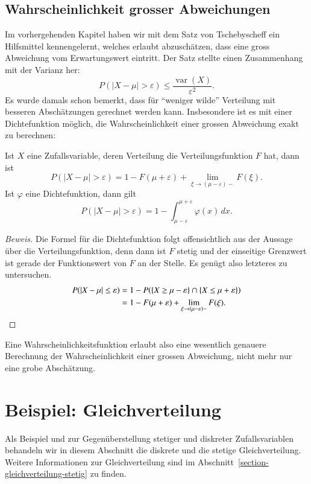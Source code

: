 \subsection{Wahrscheinlichkeit grosser Abweichungen}
Im vorhergehenden Kapitel haben wir mit dem Satz von Tschebyscheff ein
Hilfsmittel kennengelernt, welches erlaubt abzuschätzen, dass eine
gross Abweichung vom Erwartungswert eintritt.
Der Satz stellte einen
Zusammenhang mit der Varianz her:
\[
P(|X-\mu|>\varepsilon)\le\frac{\operatorname{var}(X)}{\varepsilon^2}.
\]
Es wurde damals schon bemerkt, dass für ``weniger wilde'' Verteilung mit
besseren Abschätzungen gerechnet werden kann.
Insbesondere ist es mit
einer Dichtefunktion möglich, die Wahrscheinlichkeit einer grossen
Abweichung exakt zu berechnen:
\begin{satz} Ist $X$ eine Zufallsvariable, deren Verteilung die
Verteilungsfunktion $F$ hat, dann ist
\[
P(|X-\mu|>\varepsilon)=
1-F(\mu+\varepsilon)+\lim_{\xi\to (\mu-\varepsilon)-}F(\xi).
\]
Ist $\varphi$ eine Dichtefunktion, dann gilt
\[
P(|X-\mu|>\varepsilon)=1-\int_{\mu-\varepsilon}^{\mu+\varepsilon}\varphi(x)\,dx.
\]
\end{satz}
\begin{proof}[Beweis]Die Formel für die Dichtefunktion folgt offensichtlich
aus der Aussage über die Verteilungsfunktion, denn dann ist $F$ stetig
und der einseitige Grenzwert ist gerade der Funktionswert von $F$ an der
Stelle.
Es genügt also letzteres
zu untersuchen.
\begin{align*}
P(|X-\mu|\le\varepsilon)
&=1-P(\{X\ge\mu-\varepsilon\}\cap\{X\le\mu+\varepsilon\})\\
&=1-F(\mu+\varepsilon)+\lim_{\xi\to (\mu-\varepsilon)-}F(\xi).
\qedhere
\end{align*}
\end{proof}
Eine Wahrscheinlichkeitsfunktion erlaubt also eine wesentlich
genauere Berechnung der Wahrscheinlichkeit einer grossen Abweichung,
nicht mehr nur eine grobe Abschätzung.

\section{Beispiel: Gleichverteilung}
Als Beispiel und zur Gegenüberstellung stetiger und diskreter Zufallsvariablen
behandeln wir in diesem Abschnitt die diskrete und die stetige
Gleichverteilung.
Weitere Informationen zur Gleichverteilung sind
im Abschnitt~\ref{section-gleichverteilung-stetig} zu finden.

